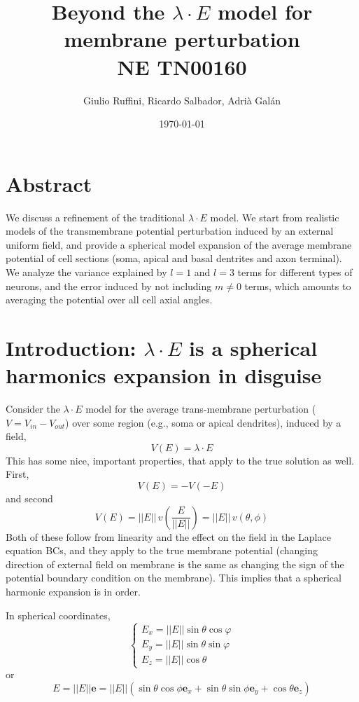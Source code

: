 \documentclass[11pt]{amsart}
\title{Beyond the $\lambda\cdot E$ model for membrane perturbation \\ NE TN00160}
\author{Giulio Ruffini, Ricardo Salbador, Adri\`a Gal\'an}
\date{\today}                                           %
\begin{document}
\maketitle

\section*{Abstract}
We discuss a refinement of the traditional $\lambda \cdot E$ model. We start from realistic models of the transmembrane potential perturbation induced by an external uniform field, and provide a spherical model expansion of the average membrane potential of cell sections (soma, apical and basal dentrites and axon terminal). We analyze the variance explained by $l=1$ and $l=3$ terms for different types of neurons, and the error induced by not including $m\neq 0$ terms, which amounts to averaging the potential over all cell axial angles.

\section{Introduction: $\lambda\cdot E$ is a spherical harmonics expansion in disguise}

Consider the $\lambda\cdot E$ model for the average trans-membrane perturbation ($V= V_{in}-V_{out}$) over some region (e.g., soma or apical dendrites), induced by a field, 
\begin{equation} 
    V(E)=\lambda\cdot E
\end{equation}
This has some  nice, important properties, that apply to the true solution as well.
First, 
$$
V(E)=-V(-E)
$$
and second
$$
V(E)=||E||\, v(\frac{E}{||E||}) = ||E||\, v (\theta,\phi)
$$
Both of these follow from linearity and the effect on the field in the Laplace equation BCs, and they apply to the true membrane potential (changing direction of external field on membrane is the same as changing the sign of the potential boundary condition on the membrane).
This implies that a spherical harmonic expansion is in order.

In spherical coordinates,
$$
\left\{\begin{array}{l}
E_x=||E|| \sin \theta \cos \varphi \\
E_y=||E|| \sin \theta \sin \varphi \\
E_z=||E|| \cos \theta
\end{array}\right.
$$
or
$$
E =||E|| \boldsymbol{e}=||E|| (\sin \theta \cos \phi \boldsymbol{e}_{x}+\sin \theta \sin \phi \boldsymbol{e}_{y}+\cos \theta \boldsymbol{e}_{z})
$$
\end{document}
